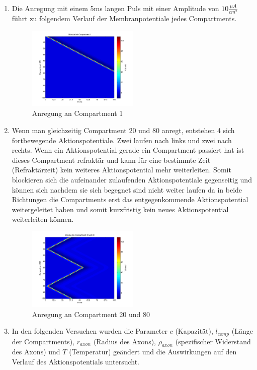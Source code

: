 \documentclass[conference]{IEEEtran}
\begin{document}
\begin{enumerate}

\item Die Anregung mit einem 5ms langen Puls mit einer Amplitude von $10\frac{\mu A}{cm^2}$ führt zu folgendem Verlauf der Membranpotentiale jedes Compartments. 

\begin{figure}[h]
	\centering
	\includegraphics[width=0.5\textwidth]{img/compart1.png}
	\caption{Anregung an Compartment 1}
	\label{fig:compart1}
\end{figure}

\item Wenn man gleichzeitig Compartment 20 und 80 anregt, entstehen 4 sich fortbewegende Aktionspotentiale. Zwei laufen nach links und zwei nach rechts. Wenn ein Aktionspotential gerade ein Compartment passiert hat ist dieses Compartment refraktär und kann für eine bestimmte Zeit (Refraktärzeit) kein weiteres Aktionspotential mehr weiterleiten. Somit blockieren sich die aufeinander zulaufenden Aktionspotentiale gegenseitig und können sich nachdem sie sich begegnet sind nicht weiter laufen da in beide Richtungen die Compartments erst das entgegenkommende Aktionspotential weitergeleitet haben und somit kurzfristig kein neues Aktionspotential weiterleiten können.

\begin{figure}[h]
	\centering
	\includegraphics[width=0.5\textwidth]{img/compart20and80.png}
	\caption{Anregung an Compartment 20 und 80}
	\label{fig:compart1}
\end{figure}

\item In den folgenden Versuchen wurden die Parameter $c$ (Kapazität), $l_{comp}$ (Länge der Compartments), $r_{axon}$ (Radius des Axons), $\rho_{axon}$ (spezifischer Widerstand des Axons) und $T$ (Temperatur) geändert und die Auswirkungen auf den Verlauf des Aktionspotentials untersucht.

\end{enumerate}
\end{document}
